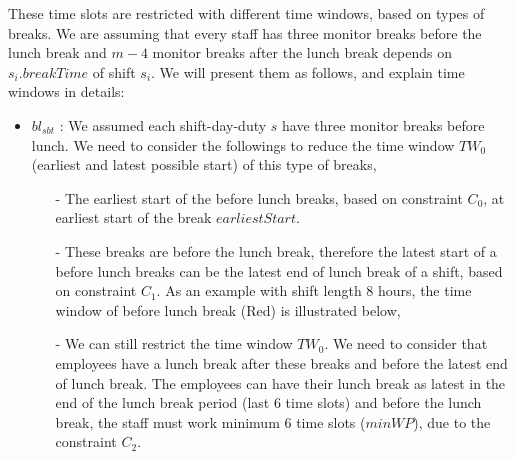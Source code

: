 These time slots are restricted with different time windows, based on types of breaks.  We are assuming that every staff has three monitor breaks before the lunch break and $m-4$ monitor breaks after the lunch break depends on $s_i.breakTime$ of shift $s_i$. We will present them as follows, and explain time windows in details:
\begin{itemize}

\item $bl_{sbt}$ : We assumed each shift-day-duty $s$ have three monitor breaks before lunch. We need to consider the followings to reduce the time window $TW_0$ (earliest and latest possible start) of this type of breaks, 


\begin{itemize}
\item[-] The earliest start of the before lunch breaks, based on constraint $C_0$, at  earliest start of the break $earliestStart$.
\item[-] These breaks are before the lunch break, therefore the latest start of a before lunch breaks can be the latest end of lunch break of a shift, based on constraint $C_1$. As an example with shift length 8 hours, the time window of before lunch break (Red) is illustrated below, \\



\item[-] We can still restrict the time window $TW_0$. We need to consider that employees have a lunch break after these breaks and before the latest end of lunch break. The employees can have their lunch break as latest in the end of the lunch break period (last 6 time slots) and before the lunch break, the staff must work minimum 6 time slots ($minWP$), due to the constraint $C_2$. 


\end{itemize}
\end{itemize}
